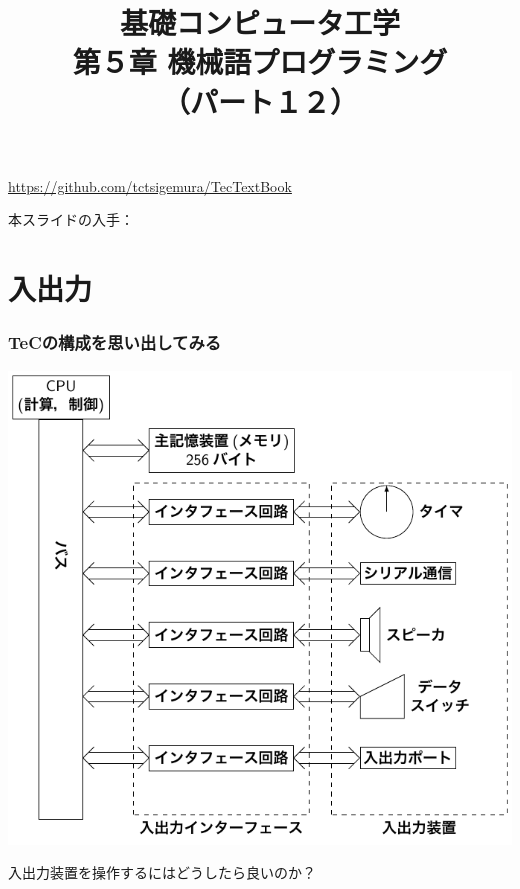 \documentclass[handout]{beamer}        %
\begin{document}
\title{基礎コンピュータ工学\\第５章 機械語プログラミング\\（パート１２）}
\date{}

\begin{frame}
  \titlepage
  \centerline{\url{https://github.com/tctsigemura/TecTextBook}}
  \vfill
  \centerline{本スライドの入手：
    }
\end{frame}


\section{入出力}
\begin{frame}
  \frametitle{TeCの構成を思い出してみる}
  \centerline{\includegraphics[scale=0.67]{../Tikz/kousei2.pdf}}
  入出力装置を操作するにはどうしたら良いのか？
\end{frame}
\end{document}

